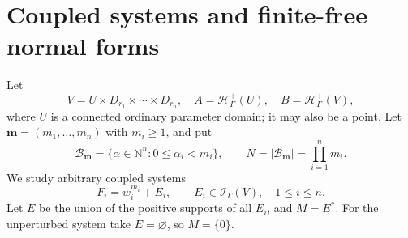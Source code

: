 \documentclass[11pt,oneside]{article}
\numberwithin{equation}{section}
\theoremstyle{definition}
\theoremstyle{remark}\newtheorem{remark}[theorem]{Remark}
\newcommand{\N}{\mathbb N}
\newcommand{\Hp}{\mathcal H^{+}_{\Gamma}}
\newcommand{\Ip}{\mathcal I_{\Gamma}}
\newcommand{\boxset}{\mathcal B_{\boldsymbol m}}
\begin{document}
\section{Coupled systems and finite-free normal forms}\label{sec:finite}
Let
\[
 V=U\times D_{r_1}\times\cdots\times D_{r_n},
 \quad A=\Hp(U),\quad B=\Hp(V),
\]
where \(U\) is a connected ordinary parameter domain; it may also be a point. Let \(\boldsymbol m=(m_1,\ldots,m_n)\) with \(m_i\geq1\), and put
\[
 \boxset=\{\alpha\in\N^n:0\leq\alpha_i<m_i\},
 \qquad N=|\boxset|=\prod_{i=1}^n m_i.
\]
We study arbitrary coupled systems
\begin{equation}\label{eq:system}
 F_i=w_i^{m_i}+E_i,\qquad E_i\in\Ip(V),\quad1\leq i\leq n.
\end{equation}
Let \(E\) be the union of the positive supports of all \(E_i\), and \(M=E^*\). For the unperturbed system take \(E=\varnothing\), so \(M=\{0\}\).
\end{document}
